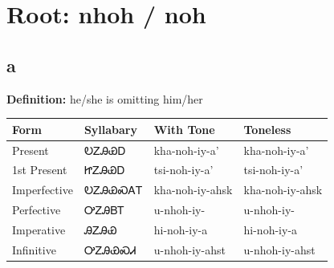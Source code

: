 \documentclass{article}%
\begin{document}
%
\normalsize%
\section*{Root: nhoh / noh}%
\subsection*{a}%
\textbf{Definition: }%
he/she is omitting him/her%
\\[0.5em]%
\begin{tabular}{|l|l|l|l|}%
\hline%
\textbf{Form}&\textbf{Syllabary}&\textbf{With Tone}&\textbf{Toneless}\\%
\hline%
Present&ᎧᏃᎯᏯᎠ&kha{-}noh{-}iy{-}a'&kha{-}noh{-}iy{-}a'\\%
1st Present&ᏥᏃᎯᏯᎠ&tsi{-}noh{-}iy{-}a'&tsi{-}noh{-}iy{-}a'\\%
Imperfective&ᎧᏃᎯᏯᏍᎪᎢ&kha{-}noh{-}iy{-}ahsk&kha{-}noh{-}iy{-}ahsk\\%
Perfective&ᎤᏃᎯᏴᎢ&u{-}nhoh{-}iy{-}&u{-}nhoh{-}iy{-}\\%
Imperative&ᎯᏃᎯᏯ&hi{-}noh{-}iy{-}a&hi{-}noh{-}iy{-}a\\%
Infinitive&ᎤᏃᎯᏯᏍᏗ&u{-}nhoh{-}iy{-}ahst&u{-}nhoh{-}iy{-}ahst\\%
\hline%
\end{tabular}%
\\[1em]%
\end{document}
